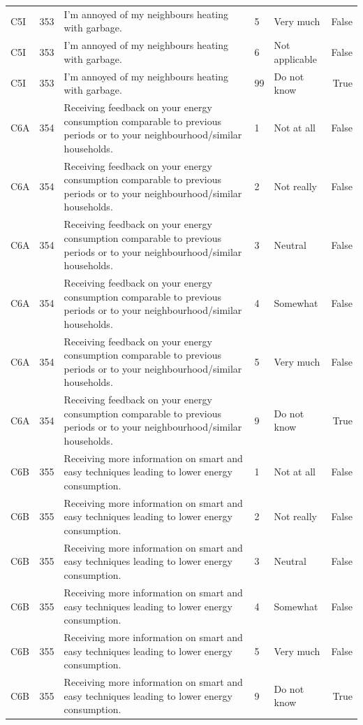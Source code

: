 \begin{tabular}{lrlllr}
C5I & 353 & I’m annoyed of my neighbours heating with garbage. & 5 & Very much & False \\
C5I & 353 & I’m annoyed of my neighbours heating with garbage. & 6 & Not applicable & False \\
C5I & 353 & I’m annoyed of my neighbours heating with garbage. & 99 & Do not know & True \\
C6A & 354 & Receiving feedback on your energy consumption comparable to previous periods or to your neighbourhood/similar households. & 1 & Not at all & False \\
C6A & 354 & Receiving feedback on your energy consumption comparable to previous periods or to your neighbourhood/similar households. & 2 & Not really & False \\
C6A & 354 & Receiving feedback on your energy consumption comparable to previous periods or to your neighbourhood/similar households. & 3 & Neutral & False \\
C6A & 354 & Receiving feedback on your energy consumption comparable to previous periods or to your neighbourhood/similar households. & 4 & Somewhat & False \\
C6A & 354 & Receiving feedback on your energy consumption comparable to previous periods or to your neighbourhood/similar households. & 5 & Very much & False \\
C6A & 354 & Receiving feedback on your energy consumption comparable to previous periods or to your neighbourhood/similar households. & 9 & Do not know & True \\
C6B & 355 & Receiving more information on smart and easy techniques leading to lower energy consumption. & 1 & Not at all & False \\
C6B & 355 & Receiving more information on smart and easy techniques leading to lower energy consumption. & 2 & Not really & False \\
C6B & 355 & Receiving more information on smart and easy techniques leading to lower energy consumption. & 3 & Neutral & False \\
C6B & 355 & Receiving more information on smart and easy techniques leading to lower energy consumption. & 4 & Somewhat & False \\
C6B & 355 & Receiving more information on smart and easy techniques leading to lower energy consumption. & 5 & Very much & False \\
C6B & 355 & Receiving more information on smart and easy techniques leading to lower energy consumption. & 9 & Do not know & True \\

\end{tabular}
